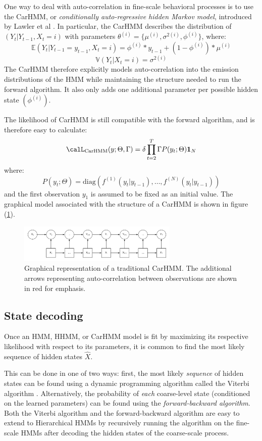 One way to deal with auto-correlation in fine-scale behavioral processes is to use the CarHMM, or \textit{conditionally auto-regressive hidden Markov model}, introduced by Lawler et al \citep{Lawler:2019}. In particular, the CarHMM describes the distribution of $(Y_t|Y_{t-1}, X_t=i)$ with parameters $\theta^{(i)} = \{\mu^{(i)},\sigma^{2(i)},\phi^{(i)}\}$, where:
%
$$\mathbb{E}(Y_t|Y_{t-1} = y_{t-1},X_t=i) = \phi^{(i)}*y_{t-1} + (1-\phi^{(i)}) * \mu^{(i)}$$
$$\mathbb{V}(Y_t| X_t = i) = \sigma^{2(i)}$$
%
The CarHMM therefore explicitly models auto-correlation into the emission distributions of the HMM while maintaining the structure needed to run the forward algorithm. It also only adds one additional parameter per possible hidden state $(\phi^{(i)})$. 

The likelihood of CarHMM is still compatible with the forward algorithm, and is therefore easy to calculate:
\begin{equation}
\calL_{\text{CarHMM}}(y;\Theta,\Gamma) = \delta \prod_{t=2}^T \Gamma P(y_t;\Theta) \mathbf{1}_N
\label{CarHMM_likelihood}
\end{equation}
where:
%
$$P(y_t;\Theta) = \text{diag}\left(f^{(1)}(y_t|y_{t-1}), \ldots , f^{(N)}(y_t|y_{t-1}) \right)$$
%
and the first observation $y_1$ is assumed to be fixed as an initial value. The graphical model associated with the structure of a CarHMM is shown in figure (\ref{fig:CarHMM}).

\begin{figure}[h!]
	\centering
	\includegraphics[width=3in]{../Plots/CarHMM.png}
	\caption{Graphical representation of a traditional CarHMM. The additional arrows representing auto-correlation between observations are shown in red for emphasis.}
	\label{fig:CarHMM}
\end{figure}


\subsection{State decoding}

Once an HMM, HHMM, or CarHMM model is fit by maximizing its respective likelihood with respect to its parameters, it is common to find the most likely sequence of hidden states $\hat X$. 

This can be done in one of two ways: first, the most likely \textit{sequence} of  hidden states can be found using a dynamic programming algorithm called the Viterbi algorithm \citep{Viterbi:1967}. Alternatively, the probability of \textit{each} coarse-level state (conditioned on the learned parameters) can be found using the \textit{forward-backward algorithm}. Both the Viterbi algorithm and the forward-backward algorithm are easy to extend to Hierarchical HMMs by recursively running the algorithm on the fine-scale HMMs after decoding the hidden states of the coarse-scale process.

